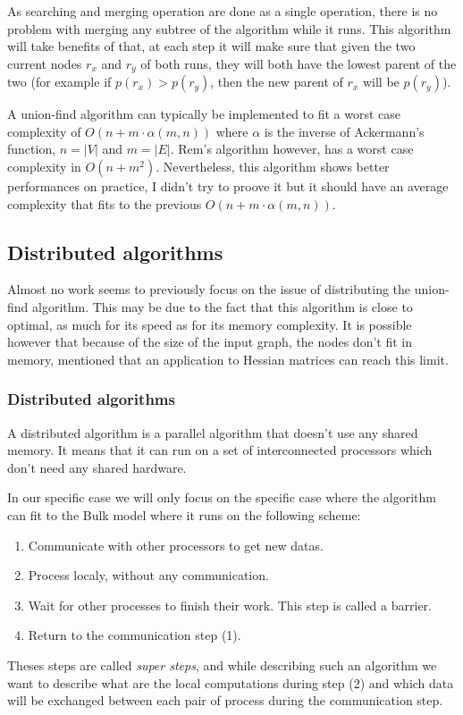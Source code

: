 \documentclass[12px]{article}
\begin{document}
      As searching and merging operation are done as a single operation, there is no problem with merging any subtree of the algorithm while it runs. This algorithm will take benefits of that, at each step it will make sure that given the two current nodes $r_x$ and $r_y$ of both runs, they will both have the lowest parent of the two (for example if $p(r_x) > p(r_y)$, then the new parent of $r_x$ will be $p(r_y)$).

      A union-find algorithm can typically be implemented to fit a worst case complexity of $O(n + m \cdot \alpha(m, n))$ where $\alpha$ is the inverse of Ackermann's function, $n = |V|$ and $m = |E|$. Rem's algorithm however, has a worst case complexity in $O(n + m^2)$. 
      Nevertheless, this algorithm shows better performances on practice, I didn't try to proove it but it should have an average complexity that fits to the previous $O(n + m \cdot \alpha(m, n))$.

    \subsection{Distributed algorithms}
      Almost no work seems to previously focus on the issue of distributing the union-find algorithm.
      This may be due to the fact that this algorithm is close to optimal, as much for its speed as for its memory complexity.
      It is possible however that because of the size of the input graph, the nodes don't fit in memory,  mentioned that an application to Hessian matrices can reach this limit.

      \subsubsection{Distributed algorithms}
        A distributed algorithm is a parallel algorithm that doesn't use any shared memory. It means that it can run on a set of interconnected processors which don't need any shared hardware.

        In our specific case we will only focus on the specific case where the algorithm can fit to the Bulk model where it runs on the following scheme:
          \begin{enumerate}
            \item Communicate with other processors to get new datas.
            \item Process localy, without any communication.
            \item Wait for other processes to finish their work. This step is called a barrier.
            \item Return to the communication step (1).
          \end{enumerate}
        Theses steps are called \emph{super steps}, and while describing such an algorithm we want to describe what are the local computations during step (2) and which data will be exchanged between each pair of process during the communication step.
\end{document}
